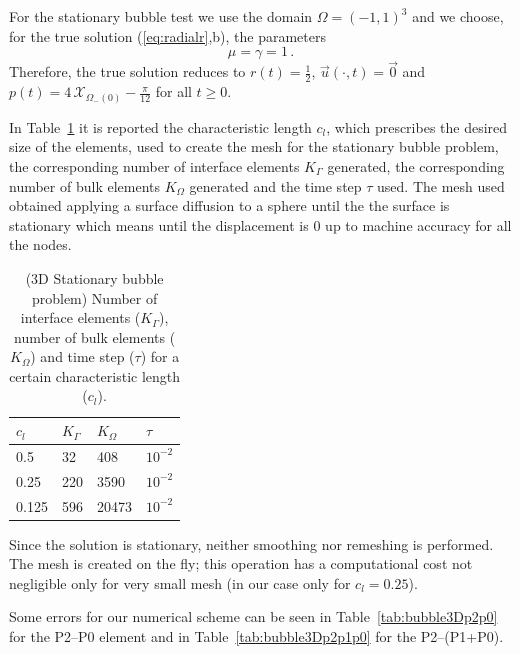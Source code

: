 \documentclass[a4paper,12pt,onecolumn]{article}
\newcommand{\bigchi}{\ensuremath{\mathrm{\mathcal{X}}}}
\newcommand{\charfcn}[1]{\bigchi_{#1}} %
\begin{document}
For the stationary bubble test we use the domain $\Omega = (-1,1)^3$ and we choose, for the true solution (\ref{eq:radialr},b), the parameters
\begin{equation*}
\mu = \gamma = 1\,. 
\end{equation*}
Therefore, the true solution reduces to $r(t) = \frac{1}{2}$, $\vec u(\cdot, t) = \vec 0$ and $p(t) = 4\,\charfcn{\Omega_-(0)} - \frac{\pi}{12}$ for all $t\geq0$.

In Table~\ref{tab:bubble3Delements} it is reported the characteristic length $c_l$, which prescribes the desired size of the elements, used to create the mesh for the stationary bubble problem, the corresponding number of interface elements $K_\Gamma$ generated, the corresponding number of bulk elements $K_\Omega$ generated and the time step $\tau$ used. The mesh used obtained applying a surface diffusion to a sphere until the the surface is stationary which means until the displacement is 0 up to machine accuracy for all the nodes.
\begin{table}
 \center
 \hspace*{-2cm}
\begin{tabular}{llll}
\hline
$c_l$ & $K_\Gamma$ & $K_\Omega$ & $\tau$ \\
\hline
0.5 & 32 & 408 & $10^{-2}$ \\
0.25 & 220 & 3590 & $10^{-2}$\\
0.125 & 596 & 20473 & $10^{-2}$\\
\hline
\end{tabular}
\hspace*{-2cm}
\caption{(3D Stationary bubble problem) Number of interface elements ($K_\Gamma$), number of bulk elements ($K_\Omega$) and time step ($\tau$) for a certain characteristic length ($c_l$).}
\label{tab:bubble3Delements}
\end{table}

Since the solution is stationary, neither smoothing nor remeshing is performed. The mesh is created on the fly; this operation has a computational cost not negligible only for very small mesh (in our case only for $c_l=0.25$). 

Some errors for our numerical scheme can be seen in Table~\ref{tab:bubble3Dp2p0} for the P2--P0 element and in Table~\ref{tab:bubble3Dp2p1p0} for the P2--(P1+P0). 
\end{document}
